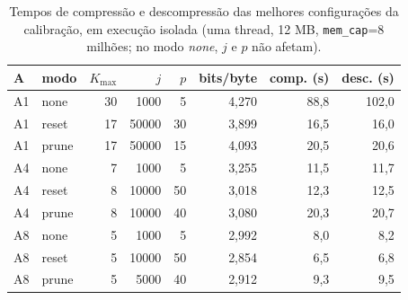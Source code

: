 \begin{table}[H]
\centering
\setlength{\tabcolsep}{5pt}
\caption{Tempos de compress\~ao e descompress\~ao das melhores configura\c{c}\~oes da calibra\c{c}\~ao, em execu\c{c}\~ao isolada (uma thread, 12 MB, \texttt{mem\_cap}=8 milh\~oes; no modo \emph{none}, $j$ e $p$ n\~ao afetam).}
\label{tab:dec-times}
\begin{tabular}{llrrrrrr}
\toprule
A & modo & $K_{\max}$ & $j$ & $p$ & bits/byte & comp. (s) & desc. (s) \\
\midrule
A1 & none & 30 & 1000 & 5 & 4,270 & 88,8 & 102,0 \\
A1 & reset & 17 & 50000 & 30 & 3,899 & 16,5 & 16,0 \\
A1 & prune & 17 & 50000 & 15 & 4,093 & 20,5 & 20,6 \\
A4 & none & 7 & 1000 & 5 & 3,255 & 11,5 & 11,7 \\
A4 & reset & 8 & 10000 & 50 & 3,018 & 12,3 & 12,5 \\
A4 & prune & 8 & 10000 & 40 & 3,080 & 20,3 & 20,7 \\
A8 & none & 5 & 1000 & 5 & 2,992 & 8,0 & 8,2 \\
A8 & reset & 5 & 10000 & 50 & 2,854 & 6,5 & 6,8 \\
A8 & prune & 5 & 5000 & 40 & 2,912 & 9,3 & 9,5 \\
\bottomrule
\end{tabular}
\end{table}
